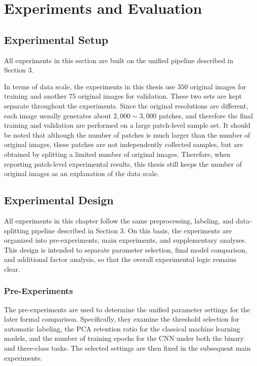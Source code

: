 \section{Experiments and Evaluation}
\subsection{Experimental Setup}
\par All experiments in this section are built on the unified pipeline described
in Section 3. \par In terms of data scale, the experiments in this thesis use
$350$ original images for training and another $75$ original images for
validation. These two sets are kept separate throughout the experiments. Since
the original resolutions are different, each image usually generates about
$2,000\sim3,000$ patches, and therefore the final training and validation are
performed on a large patch-level sample set. It should be noted that although
the number of patches is much larger than the number of original images, these
patches are not independently collected samples, but are obtained by splitting a
limited number of original images. Therefore, when reporting patch-level
experimental results, this thesis still keeps the number of original images as
an explanation of the data scale.

\subsection{Experimental Design}
\par All experiments in this chapter follow the same preprocessing, labeling,
and data-splitting pipeline described in Section 3. On this basis, the
experiments are organized into pre-experiments, main experiments, and
supplementary analyses. This design is intended to separate parameter selection,
final model comparison, and additional factor analysis, so that the overall
experimental logic remains clear.

\subsubsection{Pre-Experiments}
\par The pre-experiments are used to determine the unified parameter settings
for the later formal comparison. Specifically, they examine the threshold
selection for automatic labeling, the PCA retention ratio for the classical
machine learning models, and the number of training epochs for the CNN under
both the binary and three-class tasks. The selected settings are then fixed in
the subsequent main experiments.

